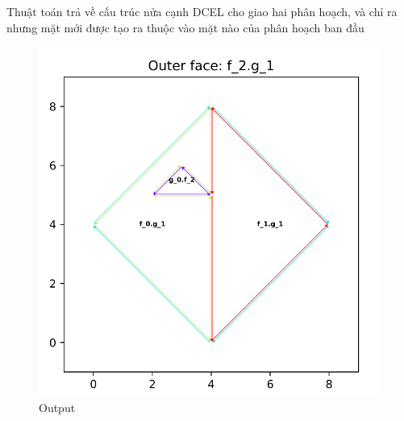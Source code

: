 \documentclass[15pt]{article}
\begin{document}
{\begin{figure}
\end{figure}
Thuật toán trả về cấu trúc nửa cạnh DCEL cho giao hai phân hoạch, và chỉ ra nhưng mặt mới được tạo ra thuộc vào mặt nào của phân hoạch ban đầu
\begin{figure}[h!]
\centering
\includegraphics[scale=0.5]{./overlay_ex.png}
\caption{Output}
\label{fig: ouput}
\end{figure}

}
\end{document}
